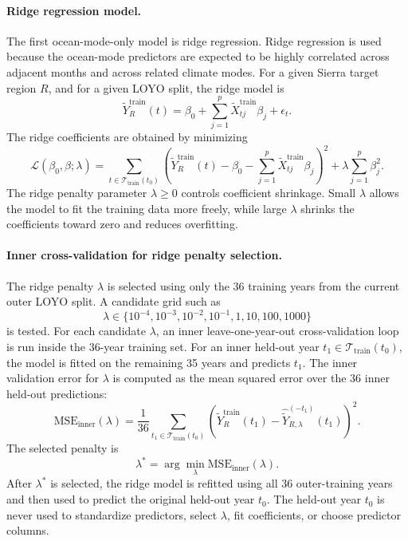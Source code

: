 \documentclass[11pt]{article}
\begin{document}
\paragraph{Ridge regression model.}
The first ocean-mode-only model is ridge regression. Ridge regression is used because the
ocean-mode predictors are expected to be highly correlated across adjacent months and across related
climate modes. For a given Sierra target region $R$, and for a given LOYO split, the ridge model is
\[
\widetilde{Y}^{\mathrm{train}}_R(t)
=
\beta_0
+
\sum_{j=1}^{p}\widetilde{X}^{\mathrm{train}}_{tj}\beta_j
+
\epsilon_t.
\]
The ridge coefficients are obtained by minimizing
\[
\mathcal{L}(\beta_0,\beta;\lambda)
=
\sum_{t\in\mathcal{T}_{\mathrm{train}}(t_0)}
\left(
\widetilde{Y}^{\mathrm{train}}_R(t)
-
\beta_0
-
\sum_{j=1}^{p}\widetilde{X}^{\mathrm{train}}_{tj}\beta_j
\right)^2
+
\lambda
\sum_{j=1}^{p}\beta_j^2.
\]
The ridge penalty parameter $\lambda\ge 0$ controls coefficient shrinkage. Small $\lambda$ allows
the model to fit the training data more freely, while large $\lambda$ shrinks the coefficients
toward zero and reduces overfitting.

\paragraph{Inner cross-validation for ridge penalty selection.}
The ridge penalty $\lambda$ is selected using only the 36 training years from the current outer
LOYO split. A candidate grid such as
\[
\lambda \in \{10^{-4},10^{-3},10^{-2},10^{-1},1,10,100,1000\}
\]
is tested. For each candidate $\lambda$, an inner leave-one-year-out cross-validation loop is run
inside the 36-year training set. For an inner held-out year $t_1\in\mathcal{T}_{\mathrm{train}}(t_0)$, the
model is fitted on the remaining 35 years and predicts $t_1$. The inner validation error for
$\lambda$ is computed as the mean squared error over the 36 inner held-out predictions:
\[
\mathrm{MSE}_{\mathrm{inner}}(\lambda)
=
\frac{1}{36}
\sum_{t_1\in \mathcal{T}_{\mathrm{train}}(t_0)}
\left(
\widetilde{Y}^{\mathrm{train}}_R(t_1)
-
\widehat{\widetilde{Y}}^{(-t_1)}_{R,\lambda}(t_1)
\right)^2.
\]
The selected penalty is
\[
\lambda^\ast
=
\arg\min_{\lambda}
\mathrm{MSE}_{\mathrm{inner}}(\lambda).
\]
After $\lambda^\ast$ is selected, the ridge model is refitted using all 36 outer-training years
and then used to predict the original held-out year $t_0$. The held-out year $t_0$ is never used
to standardize predictors, select $\lambda$, fit coefficients, or choose predictor columns.
\end{document}
